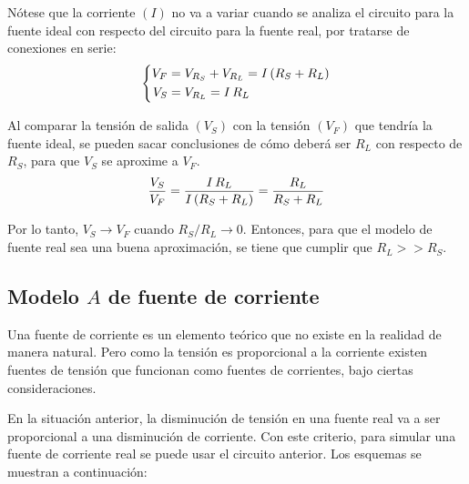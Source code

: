Nótese que la corriente $(I)$ no va a variar cuando se analiza el circuito para la fuente ideal con respecto del circuito para la fuente real, por tratarse de conexiones en serie:
\begin{equation*}
    \left\{
    \begin{aligned}
        V_F &= V_{R_S} + V_{R_L} = I \left(R_S + R_L\right)
        \\
        V_S &= V_{R_L} = I \, R_L
    \end{aligned}
    \right.
\end{equation*}

Al comparar la tensión de salida $(V_S)$ con la tensión $(V_F)$ que tendría la fuente ideal, se pueden sacar conclusiones de cómo deberá ser $R_L$ con respecto de $R_S$, para que $V_S$ se aproxime a $V_F$.
\begin{equation*}
    \frac{V_S}{V_F} = \frac{I \, R_L}{I \left(R_S + R_L\right)} = \frac{R_L}{R_S + R_L}
\end{equation*}

Por lo tanto, $V_S \to V_F$ cuando $R_S / R_L \to 0$.
Entonces, para que el modelo de fuente real sea una buena aproximación, se tiene que cumplir que $R_L >> R_S$.

\begin{center}
    \def\svgwidth{0.6\linewidth}
    
\end{center}


\subsection{Modelo $A$ de fuente de corriente}

Una fuente de corriente es un elemento teórico que no existe en la realidad de manera natural.
Pero como la tensión es proporcional a la corriente existen fuentes de tensión que funcionan como fuentes de corrientes, bajo ciertas consideraciones.

En la situación anterior, la disminución de tensión en una fuente real va a ser proporcional a una disminución de corriente.
Con este criterio, para simular una fuente de corriente real se puede usar el circuito anterior.
Los esquemas se muestran a continuación:

\begin{multicols}{2}
    \begin{center}
        \def\svgwidth{0.9\linewidth}
        
    \end{center}
    \begin{center}
        \def\svgwidth{0.9\linewidth}
        
    \end{center}
\end{multicols}

